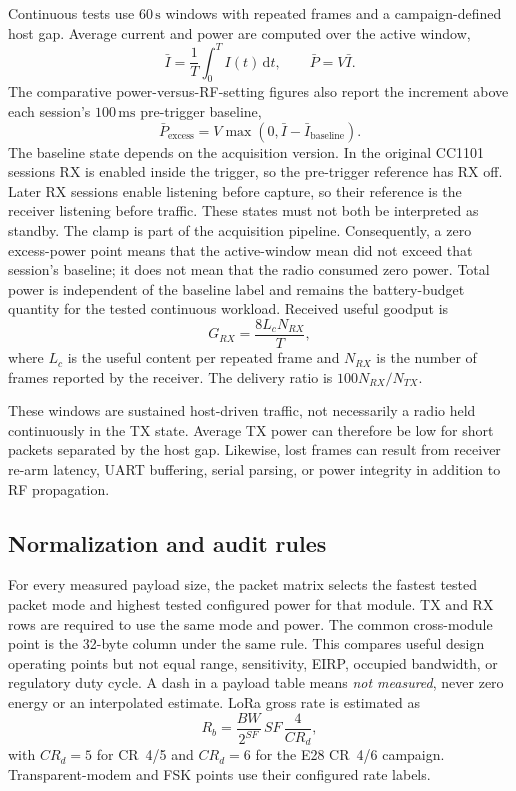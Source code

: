 \documentclass[10pt,a4paper]{article}
\newcommand{\SI}[2]{\ensuremath{#1\,\mathrm{#2}}}
\begin{document}
Continuous tests use \SI{60}{s} windows with repeated frames and a campaign-defined host gap. Average current and power are computed over the active window,
\begin{equation}
  \bar{I}=\frac{1}{T}\int_0^T I(t)\,\mathrm{d}t,
  \qquad \bar{P}=V\bar{I}.
\end{equation}
The comparative power-versus-RF-setting figures also report the increment above each session's \SI{100}{ms} pre-trigger baseline,
\begin{equation}
  \bar{P}_{\mathrm{excess}}=V\max\!\left(0,\bar{I}-\bar{I}_{\mathrm{baseline}}\right).
\end{equation}
The baseline state depends on the acquisition version. In the original CC1101 sessions RX is enabled inside the trigger, so the pre-trigger reference has RX off. Later RX sessions enable listening before capture, so their reference is the receiver listening before traffic. These states must not both be interpreted as standby. The clamp is part of the acquisition pipeline. Consequently, a zero excess-power point means that the active-window mean did not exceed that session's baseline; it does not mean that the radio consumed zero power. Total power is independent of the baseline label and remains the battery-budget quantity for the tested continuous workload.
Received useful goodput is
\begin{equation}
  G_{RX}=\frac{8L_cN_{RX}}{T},
\end{equation}
where $L_c$ is the useful content per repeated frame and $N_{RX}$ is the number of frames reported by the receiver. The delivery ratio is $100N_{RX}/N_{TX}$.

These windows are sustained host-driven traffic, not necessarily a radio held continuously in the TX state. Average TX power can therefore be low for short packets separated by the host gap. Likewise, lost frames can result from receiver re-arm latency, UART buffering, serial parsing, or power integrity in addition to RF propagation.

\subsection{Normalization and audit rules}

For every measured payload size, the packet matrix selects the fastest tested packet mode and highest tested configured power for that module. TX and RX rows are required to use the same mode and power. The common cross-module point is the 32-byte column under the same rule. This compares useful design operating points but not equal range, sensitivity, EIRP, occupied bandwidth, or regulatory duty cycle. A dash in a payload table means \emph{not measured}, never zero energy or an interpolated estimate. LoRa gross rate is estimated as
\begin{equation}
  R_b = \frac{BW}{2^{SF}}\,SF\,\frac{4}{CR_d},
\end{equation}
with $CR_d=5$ for CR~4/5 and $CR_d=6$ for the E28 CR~4/6 campaign. Transparent-modem and FSK points use their configured rate labels.
\end{document}
